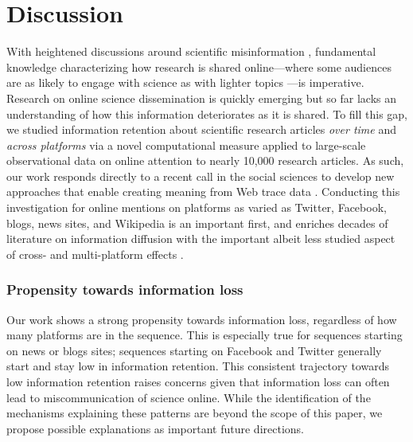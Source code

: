 \documentclass[letterpaper]{article} %
\begin{document}
\section{Discussion}
With heightened discussions around scientific misinformation \cite{scheufele2019science,westMisinformationScience2021}, fundamental knowledge characterizing how research is shared online---where some audiences are as likely to engage with science as with lighter topics \cite{hargittaiHowYoungAdults2018}---is imperative. Research on online science dissemination is quickly emerging \cite{zakhlebinDiffusionScientificArticles2020} %
but so far lacks an understanding of how this information deteriorates as it is shared. To fill this gap, we studied information retention about scientific research articles \textit{over time} and \textit{across platforms} via a novel computational measure applied to large-scale observational data on online attention to nearly 10,000 research articles. As such, our work responds directly to a recent call in the social sciences to develop new approaches that enable creating meaning from Web trace data \citep{lazerMeaningfulMeasuresHuman2021}. Conducting this investigation for online mentions on platforms as varied as Twitter, Facebook, blogs, news sites, and Wikipedia is an important first, and enriches decades of literature on information diffusion \citep{adarTrackingInformationEpidemics2005,lermanInformationContagionEmpirical2010,keeganHotWikiStructures2013,gilbertWidespreadUnderprovisionReddit2013,Goel2015,chengCanCascadesBe2014,chengCascadesRecur2016} with the important albeit less studied aspect of cross- and multi-platform effects \citep[for exceptions, see][]{leskovecMemetrackingDynamicsNews2009,tanLostPropagationUnfolding2016,zakhlebinDiffusionScientificArticles2020}.

\subsubsection{Propensity towards information loss}
Our work shows a strong propensity towards information loss, regardless of how many platforms are in the sequence. This is especially true for sequences starting on news or blogs sites; sequences starting on Facebook and Twitter generally start and stay low in information retention. This consistent trajectory towards low information retention raises concerns given that information loss can often lead to miscommunication of science online. While the identification of the mechanisms explaining these patterns are beyond the scope of this paper, we propose possible explanations as important future directions.
\end{document}
